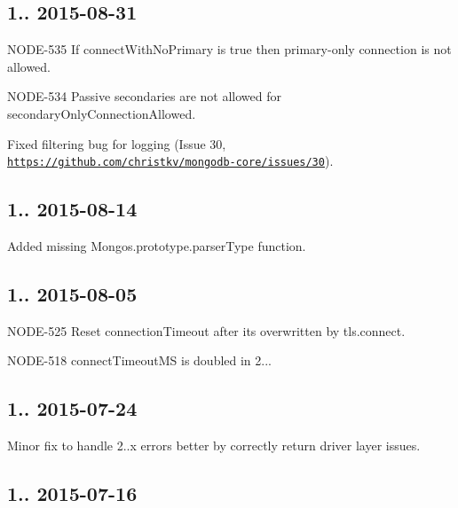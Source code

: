 \subsection*{1.. 2015-\/08-\/31 }


\begin{DoxyItemize}
\item N\+O\+D\+E-\/535 If connect\+With\+No\+Primary is true then primary-\/only connection is not allowed.
\item N\+O\+D\+E-\/534 Passive secondaries are not allowed for secondary\+Only\+Connection\+Allowed.
\item Fixed filtering bug for logging (Issue 30, \href{https://github.com/christkv/mongodb-core/issues/30}{\tt https\+://github.\+com/christkv/mongodb-\/core/issues/30}).
\end{DoxyItemize}

\subsection*{1.. 2015-\/08-\/14 }


\begin{DoxyItemize}
\item Added missing Mongos.\+prototype.\+parser\+Type function.
\end{DoxyItemize}

\subsection*{1.. 2015-\/08-\/05 }


\begin{DoxyItemize}
\item N\+O\+D\+E-\/525 Reset connection\+Timeout after it\textquotesingle{}s overwritten by tls.\+connect.
\item N\+O\+D\+E-\/518 connect\+Timeout\+MS is doubled in 2...
\end{DoxyItemize}

\subsection*{1.. 2015-\/07-\/24 }


\begin{DoxyItemize}
\item Minor fix to handle 2..\+x errors better by correctly return driver layer issues.
\end{DoxyItemize}

\subsection*{1.. 2015-\/07-\/16 }


